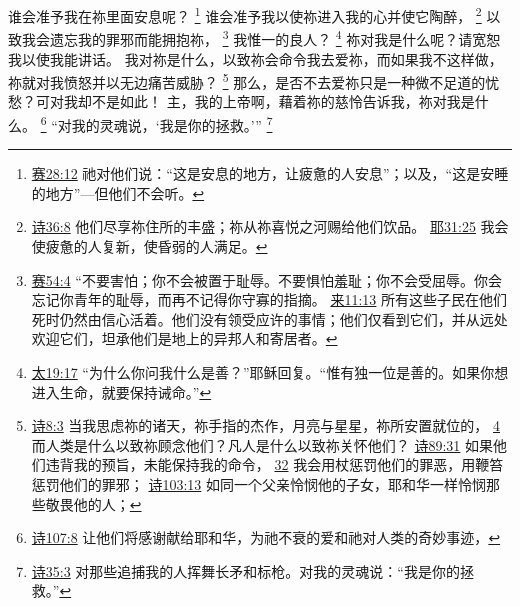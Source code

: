 \documentclass[12pt, a4paper, oneside]{ctexart}
\newcounter{parnum}[section]
\newcommand{\N}{%
   \noindent\refstepcounter{parnum}%
    \makebox[\parindent][l]{\textbf{\arabic{parnum}.}}}
\begin{document}
\N 谁会准予我在祢里面安息呢？
    \footnote {
		\href{https://biblehub.com/isaiah/28-12.htm}{赛28:12} 祂对他们说：“这是安息的地方，让疲惫的人安息”；以及，“这是安睡的地方”---但他们不会听。
	}
	谁会准予我以使祢进入我的心并使它陶醉，
    \footnote {
        \href{https://biblehub.com/psalms/36-8.htm}{诗36:8} 他们尽享祢住所的丰盛；祢从祢喜悦之河赐给他们饮品。
		\href{https://biblehub.com/jeremiah/31-25.htm}{耶31:25} 我会使疲惫的人复新，使昏弱的人满足。
	}
    以致我会遗忘我的罪邪而能拥抱祢，
    \footnote {
        \href{https://biblehub.com/isaiah/54-4.htm}{赛54:4} “不要害怕；你不会被置于耻辱。不要惧怕羞耻；你不会受屈辱。你会忘记你青年的耻辱，而再不记得你守寡的指摘。
		\href{https://biblehub.com/hebrews/11-13.htm}{来11:13} 所有这些子民在他们死时仍然由信心活着。他们没有领受应许的事情；他们仅看到它们，并从远处欢迎它们，坦承他们是地上的异邦人和寄居者。
	}
    我惟一的良人？
    \footnote {
        \href{https://biblehub.com/matthew/19-17.htm}{太19:17} “为什么你问我什么是善？”耶稣回复。“惟有独一位是善的。如果你想进入生命，就要保持诫命。”
	}
	祢对我是什么呢？请宽恕我以使我能讲话。
	我对祢是什么，以致祢会命令我去爱祢，而如果我不这样做，祢就对我愤怒并以无边痛苦威胁？
    \footnote {
        \href{https://biblehub.com/psalms/8-3.htm}{诗8:3} 当我思虑祢的诸天，祢手指的杰作，月亮与星星，祢所安置就位的，
		\href{https://biblehub.com/psalms/8-4.htm}{4} 而人类是什么以致祢顾念他们？凡人是什么以致祢关怀他们？
        \href{https://biblehub.com/psalms/89-31.htm}{诗89:31} 如果他们违背我的预旨，未能保持我的命令，
		\href{https://biblehub.com/psalms/89-32.htm}{32} 我会用杖惩罚他们的罪恶，用鞭笞惩罚他们的罪邪；
        \href{https://biblehub.com/psalms/103-13.htm}{诗103:13} 如同一个父亲怜悯他的子女，耶和华一样怜悯那些敬畏他的人；
	}
	那么，是否不去爱祢只是一种微不足道的忧愁？可对我却不是如此！
	主，我的上帝啊，藉着祢的慈怜告诉我，祢对我是什么。
    \footnote {
        \href{https://biblehub.com/psalms/107-8.htm}{诗107:8} 让他们将感谢献给耶和华，为祂不衰的爱和祂对人类的奇妙事迹，
	}
	“对我的灵魂说，‘我是你的拯救。’”
    \footnote {
        \href{https://biblehub.com/psalms/35-3.htm}{诗35:3} 对那些追捕我的人挥舞长矛和标枪。对我的灵魂说：“我是你的拯救。”
	}
\end{document}
